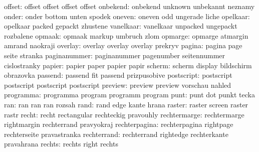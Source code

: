             offset:  offset               offset              offset
                      offset
           onbekend:  onbekend             unknown             unbekannt
                      neznamy
              onder:  onder                bottom              unten
                      spodek
             oneven:  oneven               odd                 ungerade
                      liche
           opelkaar:  opelkaar             packed              gepackt
                      zhustene
          vanelkaar:  vanelkaar            unpacked            ungepackt
                      rozbalene
             opmaak:  opmaak               markup              umbruch
                      zlom
            opmarge:  opmarge              atmargin            amrand
                      naokraji
            overlay:  overlay              overlay             overlay
                      prekryv
             pagina:  pagina               page                seite
                      stranka
       paginanummer:  paginanummer         pagenumber          seitennummer
                      cislostranky
             papier:  papier               paper               papier
                      papir
             scherm:  scherm               display             bildschirm
                      obrazovka
            passend:  passend              fit                 passend
                      prizpusobive
         postscript:  postscript           postscript          postscript
                      postscript
            preview:  preview              preview             vorschau
                      nahled
          programma:  programma            program             programm
                      program
               punt:  punt                 dot                 punkt
                      tecka
                ran:  ran                  ran                 ran
                      rozsah
               rand:  rand                 edge                kante
                      hrana
             raster:  raster               screen              raster
                      rastr
              recht:  recht                rectangular         rechteckig
                      pravouhly
       rechtermarge:  rechtermarge         rightmargin         rechterrand
                      pravyokraj
      rechterpagina:  rechterpagina        rightpage           rechterseite
                      pravastranka
        rechterrand:  rechterrand          rightedge           rechterkante
                      pravahrana
             rechts:  rechts               right               rechts
